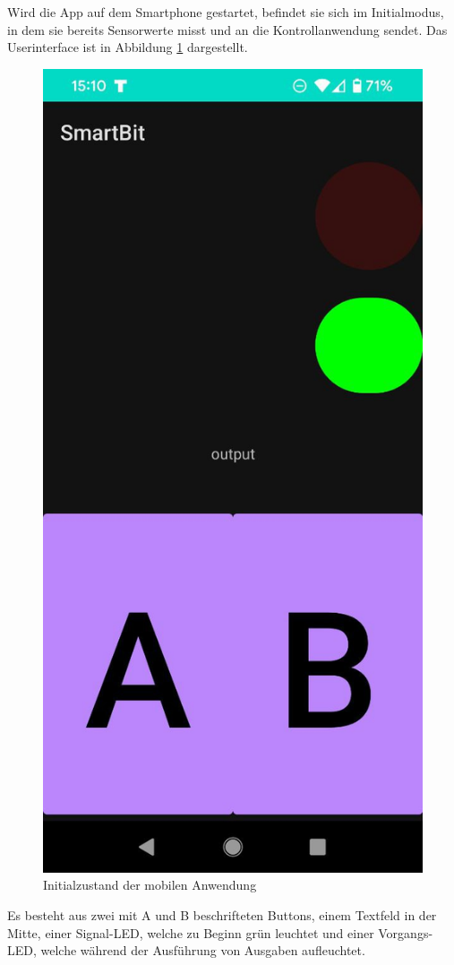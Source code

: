 \documentclass[11pt,a4paper]{report}
\begin{document}
Wird die App auf dem Smartphone gestartet, befindet sie sich im Initialmodus, in dem sie bereits Sensorwerte misst und an die Kontrollanwendung sendet.
Das Userinterface ist in Abbildung \ref{fig:initial_app} dargestellt.
\begin{figure}[htbp]
  \centering
  \includegraphics[height=0.4\textheight]{images/app_initial}
  \caption{Initialzustand der mobilen Anwendung}
  \label{fig:initial_app}
\end{figure}
Es besteht aus zwei mit A und B beschrifteten Buttons, einem Textfeld in der Mitte, einer Signal-LED, welche zu Beginn grün leuchtet und einer Vorgangs-LED, welche während der Ausführung von Ausgaben aufleuchtet.
\end{document}
